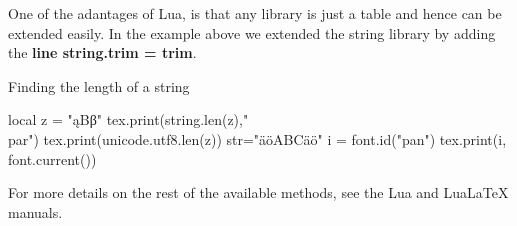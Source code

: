 One of the adantages of Lua, is that any library is just a table and hence can be extended easily. In the example above we extended the string library by adding the \textbf{line string.trim = trim}.  




\begin{texexample}{Finding the length  of a string}{}
\begin{luacode*}
local z = "ąΒβ"
tex.print(string.len(z),"\\par")
tex.print(unicode.utf8.len(z))
str="äöABCäö"
 i = font.id("pan")
 tex.print(i, font.current())
\end{luacode*}
\end{texexample}

For more details on the rest of the available methods, see the Lua and LuaLaTeX manuals.
